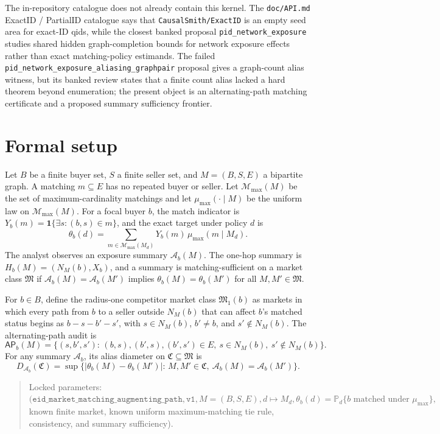 \documentclass[11pt]{article}
\renewcommand{\Pr}{\mathbb{P}}
\newcommand{\one}{\mathbf{1}}
\theoremstyle{definition}
\theoremstyle{plain}
\theoremstyle{remark}
\begin{document}
The in-repository catalogue does not already contain this kernel.  The \texttt{doc/API.md} ExactID / PartialID catalogue says that \texttt{CausalSmith/ExactID} is an empty seed area for exact-ID qids, while the closest banked proposal \texttt{pid\_network\_exposure} studies shared hidden graph-completion bounds for network exposure effects rather than exact matching-policy estimands.  The failed \texttt{pid\_network\_exposure\_aliasing\_graphpair} proposal gives a graph-count alias witness, but its banked review states that a finite count alias lacked a hard theorem beyond enumeration; the present object is an alternating-path matching certificate and a proposed summary sufficiency frontier.

\section{Formal setup}
Let \(B\) be a finite buyer set, \(S\) a finite seller set, and \(M=(B,S,E)\) a bipartite graph.  A matching \(m\subseteq E\) has no repeated buyer or seller.  Let \(\mathcal M_{\max}(M)\) be the set of maximum-cardinality matchings and let \(\mu_{\max}(\cdot\mid M)\) be the uniform law on \(\mathcal M_{\max}(M)\).  For a focal buyer \(b\), the match indicator is \(Y_b(m)=\one\{\exists s:(b,s)\in m\}\), and the exact target under policy \(d\) is
\[
\theta_b(d)=\sum_{m\in\mathcal M_{\max}(M_d)}Y_b(m)\,\mu_{\max}(m\mid M_d).
\]
The analyst observes an exposure summary \(\mathcal A_b(M)\).  The one-hop summary is \(H_b(M)=(N_M(b),X_b)\), and a summary is matching-sufficient on a market class \(\mathfrak M\) if \(\mathcal A_b(M)=\mathcal A_b(M')\) implies \(\theta_b(M)=\theta_b(M')\) for all \(M,M'\in\mathfrak M\).

For \(b\in B\), define the radius-one competitor market class \(\mathfrak M_1(b)\) as markets in which every path from \(b\) to a seller outside \(N_M(b)\) that can affect \(b\)'s matched status begins as \(b-s-b'-s'\), with \(s\in N_M(b)\), \(b'\ne b\), and \(s'\notin N_M(b)\).  The alternating-path audit is
\[
\mathsf{AP}_b(M)=\{(s,b',s'):\, (b,s),(b',s),(b',s')\in E,\ s\in N_M(b),\ s'\notin N_M(b)\}.
\]
For any summary \(\mathcal A_b\), its alias diameter on \(\mathfrak C\subseteq\mathfrak M\) is
\[
D_{\mathcal A_b}(\mathfrak C)=
\sup\{|\theta_b(M)-\theta_b(M')|:\,M,M'\in\mathfrak C,\ \mathcal A_b(M)=\mathcal A_b(M')\}.
\]

\begin{quote}\small
Locked parameters: \((\texttt{eid\_market\_matching\_augmenting\_path},\texttt{v1},M=(B,S,E),d\mapsto M_d,\theta_b(d)=\Pr_d\{b\text{ matched under }\mu_{\max}\},\) known finite market, known uniform maximum-matching tie rule, consistency, and summary sufficiency).
\end{quote}
\end{document}
